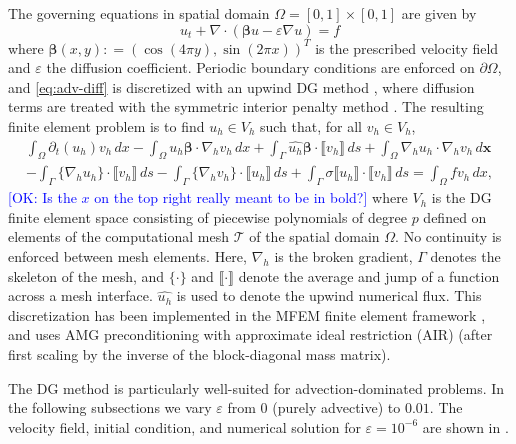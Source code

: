 \documentclass[review]{siamart}
\newcommand{\OK}[1]{\textcolor{blue}{[OK: #1]}}
\begin{document}
The governing equations in spatial domain $\Omega = [0,1] \times [0,1]$ are given by
\begin{equation} \label{eq:adv-diff}
	u_t + \nabla \cdot ( \bm\beta u  - \varepsilon \nabla u ) = f
\end{equation}
where $\bm\beta(x,y) : = (\cos(4\pi y), \sin(2 \pi x))^T$
is the prescribed velocity field and $\varepsilon$ the diffusion coefficient.
Periodic boundary conditions are enforced on $\partial\Omega$, and
\eqref{eq:adv-diff} is discretized with an upwind DG method \cite{Cockburn2001},
where diffusion terms are treated with the symmetric interior penalty method
\cite{Arnold1982,Arnold2002}. The resulting finite element problem is to find
$u_h \in V_h$ such that, for all $v_h \in V_h$,
\[
	\begin{multlined}
	\int_\Omega \partial_t (u_h) v_h \, dx
	- \int_\Omega u_h \bm\beta \cdot \nabla_h v_h \, dx
	+ \int_\Gamma \widehat{u_h} \bm\beta \cdot \llbracket v_h \rrbracket \, ds
	+ \int_\Omega \nabla_h u_h \cdot \nabla_h v_h \, d\bm x \\
	- \int_\Gamma \{ \nabla_h u_h \} \cdot \llbracket v_h \rrbracket \, ds
	- \int_\Gamma \{ \nabla_h v_h \} \cdot \llbracket u_h \rrbracket \, ds
	+ \int_\Gamma \sigma \llbracket u_h \rrbracket \cdot \llbracket v_h \rrbracket \, ds
	= \int_\Omega f v_h \, dx,
	\end{multlined}
\]
\OK{Is the $x$ on the top right really meant to be in bold?}
where $V_h$ is the DG finite element space consisting of piecewise polynomials of degree
$p$ defined on elements of the computational mesh $\mathcal{T}$ of the spatial domain
$\Omega$. No continuity is enforced between mesh elements.
Here, $\nabla_h$ is the broken gradient, $\Gamma$ denotes the skeleton of the mesh,
and $\{ \cdot \}$ and $\llbracket \cdot \rrbracket$ denote the average and jump of a
function across a mesh interface.
$\widehat{u_h}$ is used to denote the upwind numerical flux.
This discretization has been implemented in the MFEM finite element framework
\cite{Anderson2020}, and uses AMG preconditioning with approximate ideal restriction
(AIR) \cite{Manteuffel:2019,Manteuffel:2018} (after first scaling by the inverse of the
block-diagonal mass matrix).

The DG method is particularly well-suited for advection-dominated problems.
In the following subsections we vary $\varepsilon$ from $0$ (purely advective) to $0.01$.
The velocity field, initial condition, and numerical solution for $\varepsilon = 10^{-6}$
are shown in .
\end{document}

